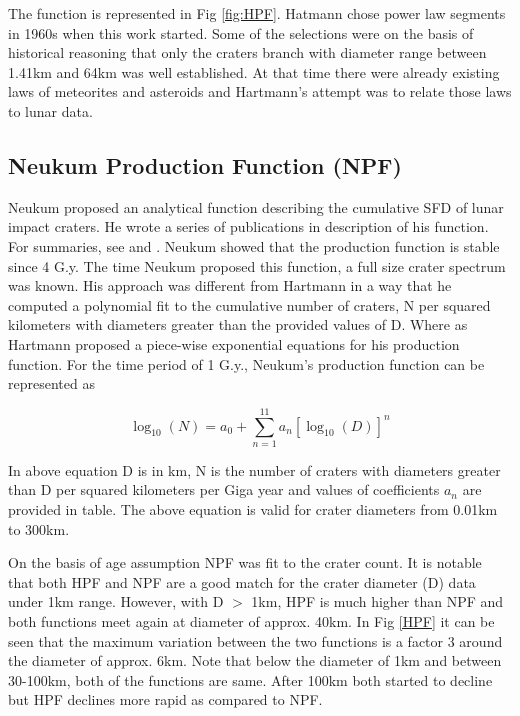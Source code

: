 \documentclass[11pt]{article}
\begin{document}
The function is represented in Fig \ref{fig:HPF}. Hatmann chose power law segments in 1960s when this work started. Some of the selections were on the basis of historical reasoning that only the craters branch with diameter range between 1.41km and 64km was well established. At that time there were already existing laws of meteorites and asteroids and Hartmann's attempt was to relate those laws to lunar data.

\subsection{Neukum Production Function (NPF)}
Neukum proposed an analytical function describing the cumulative SFD of lunar impact craters. He wrote a series of publications in description of his function. For summaries, see \cite{neukum1994crater} and \cite{neukum1983meteoritenbombardement}. Neukum showed that the production function is stable since 4 G.y. The time Neukum proposed this function, a full size crater spectrum was known. His approach was different from Hartmann in a way that he computed a polynomial fit to the cumulative number of craters, N per squared kilometers with diameters greater than the provided values of D. Where as Hartmann proposed a piece-wise exponential equations for his production function. For the time period of 1 G.y., Neukum's production function can be represented as

\begin{equation}
\log_{10} (N) = a_0 + \sum_{n=1}^{11} a_n[\log_{10} (D)]^n
\end{equation}

In above equation D is in km, N is the number of craters with diameters greater than D per squared kilometers per Giga year and values of coefficients $a_n$ are provided in table. The above equation is valid for crater diameters from 0.01km to 300km.

On the basis of age assumption NPF was fit to the crater count. It is notable that both HPF and NPF are a good match for the crater diameter (D) data under 1km range. However, with D $>$ 1km, HPF is much higher than NPF and both functions meet again at diameter of approx. 40km. In Fig \ref{HPF} it can be seen that the maximum variation between the two functions is a factor 3 around the diameter of approx. 6km. Note that below the diameter of 1km and between 30-100km, both of the functions are same. After 100km both started to decline but HPF declines more rapid as compared to NPF.
\end{document}
